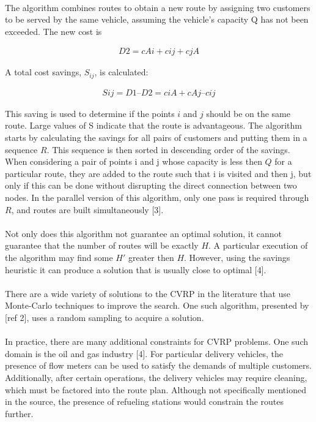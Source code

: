\documentclass[12pt]{article}
\begin{document}
\paragraph{}
The algorithm combines routes to obtain a new route by assigning two customers to be served by the same vehicle, assuming the vehicle's capacity Q has not been exceeded. The new cost is

\begin{align*}
D2 = cAi + cij + cjA
\end{align*}

A total cost savings, $S_{ij}$, is calculated:

\begin{align*}
Sij = D1 – D2 = ciA + c Aj – cij
\end{align*}

This saving is used to determine if the points $i$ and $j$ should be on the same route. Large values of S indicate that the route is advantageous. 
The algorithm starts by calculating the savings for all pairs of customers and putting them in a sequence $R$. This sequence is then sorted in descending order of the savings. When considering a pair of points i and j whose capacity is less then $Q$ for a particular route, they are added to the route such that i is visited and then j, but only if this can be done without disrupting the direct connection between two nodes. In the parallel version of this algorithm, only one pass is required through $R$, and routes are built simultaneously [3].
\paragraph{}
Not only does this algorithm not guarantee an optimal solution, it cannot guarantee that the number of routes will be exactly $H$. A particular execution of the algorithm may find some $H\prime$ greater then $H$. However, using the savings heuristic it can produce a solution that is usually close to optimal [4].
\paragraph{}
There are a wide variety of solutions to the CVRP in the literature that use Monte-Carlo techniques to improve the search. One such algorithm, presented by [ref 2], uses a random sampling to acquire a solution.
\paragraph{}
In practice, there are many additional constraints for CVRP problems. One such domain is the oil and gas industry [4]. For particular delivery vehicles, the presence of flow meters can be used to satisfy the demands of multiple customers. Additionally, after certain operations, the delivery vehicles may require cleaning, which must be factored into the route plan. Although not specifically mentioned in the source, the presence of refueling stations would constrain the routes further.
\end{document}
